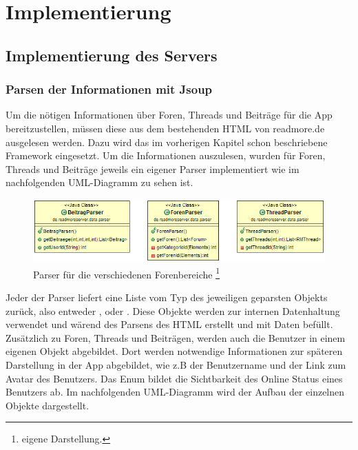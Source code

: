 \chapter{Implementierung}

\section{Implementierung des Servers}
\subsection{Parsen der Informationen mit Jsoup}
Um die nötigen Informationen über Foren, Threads und Beiträge für die App
bereitzustellen, müssen diese aus dem bestehenden HTML von readmore.de
ausgelesen werden. Dazu wird das im vorherigen Kapitel schon beschriebene
Framework  eingesetzt. Um die Informationen auszulesen,
wurden für Foren, Threads und Beiträge jeweils ein eigener Parser implementiert
wie im nachfolgenden UML-Diagramm zu sehen ist.
\begin{figure}[!htbp]
\centering
\includegraphics[width=\textwidth]{Bilder/Parser.png}
\caption[Parser für die verschiedenen Forenbereiche]{Parser für die verschiedenen Forenbereiche
 \protect\footnote{eigene Darstellung.} }
\label{dminfo}
\end{figure}
Jeder der Parser liefert eine Liste vom Typ des jeweiligen geparsten Objekts
zurück, also entweder ,  oder . Diese
Objekte werden zur internen Datenhaltung verwendet und wärend des Parsens des
HTML erstellt und mit Daten befüllt. Zusätzlich zu Foren, Threads und Beiträgen,
werden auch die Benutzer in einem eigenen Objekt abgebildet. Dort werden
notwendige Informationen zur späteren Darstellung in der App abgebildet, wie z.B
der Benutzername und der Link zum Avatar des Benutzers. Das Enum 
bildet die Sichtbarkeit des Online Status eines Benutzers ab. Im nachfolgenden
UML-Diagramm wird der Aufbau der einzelnen Objekte dargestellt.

